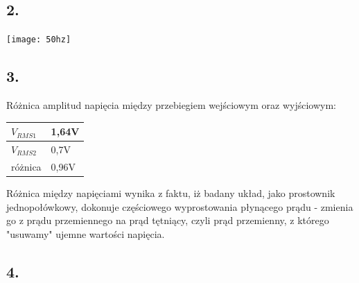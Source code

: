 \documentclass[polish,a4paper]{article}
\begin{document}
\subsection*{2.} 

\texttt{[image: 50hz]}



\subsection*{3.} Różnica amplitud napięcia między przebiegiem wejściowym oraz wyjściowym:

\begin{center}
\begin{tabular}{|l|l|}
\hline
$V_{RMS1}$ & 1,64V \\
\hline
$V_{RMS2}$ & 0,7V \\ 
\hline
różnica & 0,96V \\
\hline
\end{tabular}
\end{center}

\begin{flushleft}
Różnica między napięciami wynika z faktu, iż badany układ, jako prostownik jednopołówkowy, dokonuje częściowego wyprostowania płynącego prądu - zmienia go z prądu przemiennego na prąd tętniący, czyli prąd przemienny, z którego "usuwamy" ujemne wartości napięcia.
\end{flushleft}



\subsection*{4.}

\end{document}
